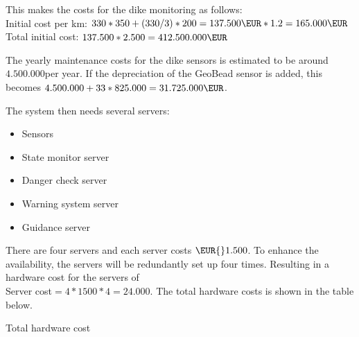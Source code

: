 This makes the costs for the dike monitoring as follows: \\
Initial cost per km: $ 330 * 350  +  (330 / 3) * 200 = 137.500 \EUR * 1.2 = 165.000 \EUR$\\
Total initial cost: $ 137.500 * 2.500 = 412.500.000 \EUR $

\newcommand{\installationCosts}{412.500.000}

The yearly maintenance costs for the dike sensors is estimated to be around $4.500.000$\EUR per year. If the depreciation of the GeoBead sensor is added, this becomes $4.500.000 + 33*825.000 = 31.725.000 \EUR$. 

The system then needs several servers:
\begin{itemize}
	\item Sensors
	\item {State monitor server}
	\item {Danger check server}	
	\item {Warning system server}	
	\item {Guidance server}	
\end{itemize}

There are four servers and each server costs $\EUR{}1.500$. To enhance the availability, the servers will be redundantly set up four times. Resulting in a hardware cost for the servers of\\
Server cost$=4*1500*4=24.000$. 
The total hardware costs is shown in the table below.
\begin{table}[H]
	\caption{Total hardware cost}
	\label{table:total-hardw-cost}
\end{table}

